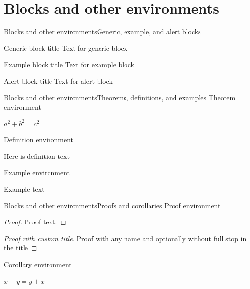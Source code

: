 \documentclass[aspectratio=169, 11pt]{beamer}
\begin{document}
\section{Blocks and other environments}	\label{sec:blocks}
\begin{frame}{Blocks and other environments}{Generic, example, and alert blocks}
	\begin{block}{Generic block title}
	Text for generic block
	\end{block}

	\begin{exampleblock}{Example block title}
	Text for example block
	\end{exampleblock}

	\begin{alertblock}{Alert block title}
	Text for alert block
	\end{alertblock}
\end{frame}


\begin{frame}{Blocks and other environments}{Theorems, definitions, and examples}
Theorem environment
	\begin{theorem}
		$a^2 + b^2 = c^2$
	\end{theorem}

Definition environment
	\begin{definition}
		Here is definition text
	\end{definition}

Example environment
	\begin{example}
		Example text
	\end{example}
\end{frame}


\begin{frame}{Blocks and other environments}{Proofs and corollaries}
Proof environment
	\begin{proof}
	Proof text.
	\end{proof}
	
	\begin{proof}[Proof with custom title\nopunct]
	Proof with any name and optionally without full stop in the title
	\end{proof}

\vspace{11pt}	
Corollary environment
	\begin{corollary}
	$ x + y = y + x  $
	\end{corollary}
\end{frame}
\end{document}
